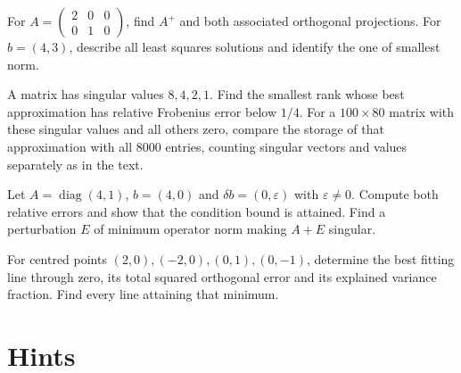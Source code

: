 \begin{exercise}[$\star$]\label{ex:v8c04a}
For $A=\begin{pmatrix}2&0&0\\0&1&0\end{pmatrix}$, find $A^+$ and both associated orthogonal projections. For $b=(4,3)$, describe all least squares solutions and identify the one of smallest norm.
\end{exercise}
\begin{exercise}[$\star$]\label{ex:v8c04b}
A matrix has singular values $8,4,2,1$. Find the smallest rank whose best approximation has relative Frobenius error below $1/4$. For a $100\times80$ matrix with these singular values and all others zero, compare the storage of that approximation with all $8000$ entries, counting singular vectors and values separately as in the text.
\end{exercise}
\begin{exercise}[$\star\star$]\label{ex:v8c04c}
Let $A=\operatorname{diag}(4,1)$, $b=(4,0)$ and $\delta b=(0,\varepsilon)$ with $\varepsilon\ne0$. Compute both relative errors and show that the condition bound is attained. Find a perturbation $E$ of minimum operator norm making $A+E$ singular.
\end{exercise}
\begin{exercise}[$\star\star$]\label{ex:v8c04d}
For centred points $(2,0),(-2,0),(0,1),(0,-1)$, determine the best fitting line through zero, its total squared orthogonal error and its explained variance fraction. Find every line attaining that minimum.
\end{exercise}

\section{Hints}


